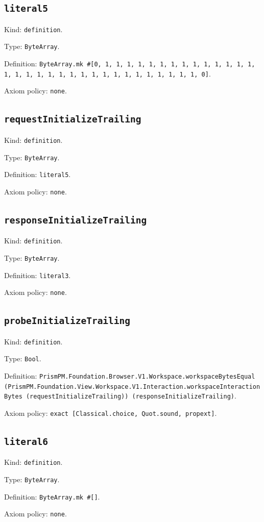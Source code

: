 \documentclass[11pt]{article}
\begin{document}
\subsection*{\texttt{literal5}}
\noindent Kind: \texttt{definition}.\par
\noindent Type: \texttt{ByteArray}.\par
\noindent Definition: \texttt{ByteArray.mk \#[0, 1, 1, 1, 1, 1, 1, 1, 1, 1, 1, 1, 1, 1, 1, 1, 1, 1, 1, 1, 1, 1, 1, 1, 1, 1, 1, 1, 1, 1, 1, 1, 1, 0]}.\par
\noindent Axiom policy: \texttt{none}.\par
\subsection*{\texttt{requestInitializeTrailing}}
\noindent Kind: \texttt{definition}.\par
\noindent Type: \texttt{ByteArray}.\par
\noindent Definition: \texttt{literal5}.\par
\noindent Axiom policy: \texttt{none}.\par
\subsection*{\texttt{responseInitializeTrailing}}
\noindent Kind: \texttt{definition}.\par
\noindent Type: \texttt{ByteArray}.\par
\noindent Definition: \texttt{literal3}.\par
\noindent Axiom policy: \texttt{none}.\par
\subsection*{\texttt{probeInitializeTrailing}}
\noindent Kind: \texttt{definition}.\par
\noindent Type: \texttt{Bool}.\par
\noindent Definition: \texttt{PrismPM.Foundation.Browser.V1.Workspace.workspaceBytesEqual (PrismPM.Foundation.View.Workspace.V1.Interaction.workspaceInteractionBytes (requestInitializeTrailing)) (responseInitializeTrailing)}.\par
\noindent Axiom policy: \texttt{exact [Classical.choice, Quot.sound, propext]}.\par
\subsection*{\texttt{literal6}}
\noindent Kind: \texttt{definition}.\par
\noindent Type: \texttt{ByteArray}.\par
\noindent Definition: \texttt{ByteArray.mk \#[]}.\par
\noindent Axiom policy: \texttt{none}.\par
\end{document}

